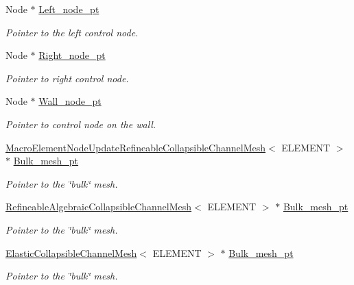 \begin{DoxyCompactItemize}
Node $\ast$ \hyperlink{classFSICollapsibleChannelProblem_a0e5fd455e2956e74485678d4357b4869}{Left\+\_\+node\+\_\+pt}
\begin{DoxyCompactList}\small\item\em Pointer to the left control node. \end{DoxyCompactList}\item 
Node $\ast$ \hyperlink{classFSICollapsibleChannelProblem_a194e116e377045afba000fba80a46fa8}{Right\+\_\+node\+\_\+pt}
\begin{DoxyCompactList}\small\item\em Pointer to right control node. \end{DoxyCompactList}\item 
Node $\ast$ \hyperlink{classFSICollapsibleChannelProblem_ad840e3bf0ee356ac054d9bcab97471d9}{Wall\+\_\+node\+\_\+pt}
\begin{DoxyCompactList}\small\item\em Pointer to control node on the wall. \end{DoxyCompactList}\item 
\hyperlink{classoomph_1_1MacroElementNodeUpdateRefineableCollapsibleChannelMesh}{Macro\+Element\+Node\+Update\+Refineable\+Collapsible\+Channel\+Mesh}$<$ E\+L\+E\+M\+E\+NT $>$ $\ast$ \hyperlink{classFSICollapsibleChannelProblem_a211bcc5fb6076133f46d63bfd827dd3f}{Bulk\+\_\+mesh\+\_\+pt}
\begin{DoxyCompactList}\small\item\em Pointer to the \char`\"{}bulk\char`\"{} mesh. \end{DoxyCompactList}\item 
\hyperlink{classoomph_1_1RefineableAlgebraicCollapsibleChannelMesh}{Refineable\+Algebraic\+Collapsible\+Channel\+Mesh}$<$ E\+L\+E\+M\+E\+NT $>$ $\ast$ \hyperlink{classFSICollapsibleChannelProblem_aa0da71e3534daa79c0c4c2e6dbc6338c}{Bulk\+\_\+mesh\+\_\+pt}
\begin{DoxyCompactList}\small\item\em Pointer to the \char`\"{}bulk\char`\"{} mesh. \end{DoxyCompactList}\item 
\hyperlink{classElasticCollapsibleChannelMesh}{Elastic\+Collapsible\+Channel\+Mesh}$<$ E\+L\+E\+M\+E\+NT $>$ $\ast$ \hyperlink{classFSICollapsibleChannelProblem_a73b35b23f07b5f79e288064c2e62e1ac}{Bulk\+\_\+mesh\+\_\+pt}
\begin{DoxyCompactList}\small\item\em Pointer to the \char`\"{}bulk\char`\"{} mesh. \end{DoxyCompactList}\item 

\end{DoxyCompactItemize}
